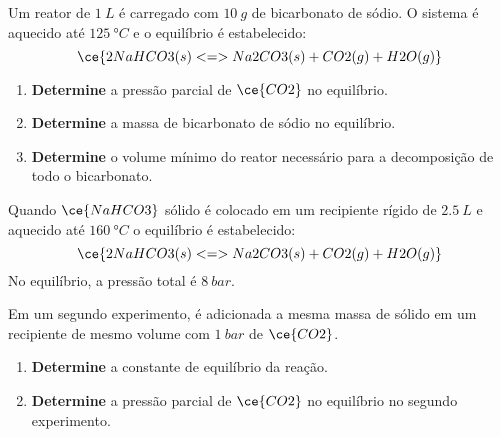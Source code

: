 \begin{problem}[
	id={2F59},
	path={/home/braun/Documents/Developer/braunchem/data/problems/Q2/2F/2F59}
]
Um reator de {\(\qty{1}{\unit{L}}\)} é carregado com {\(\qty{10}{\unit{g}}\)} de bicarbonato de sódio. O sistema é aquecido até
{\(\qty{125}{\unit{\degree C}}\)} e o equilíbrio é estabelecido: {\[
    \ce{ 2 NaHCO3(s) <=> Na2CO3(s) + CO2(g) + H2O(g) }
\]}

\begin{enumerate}
\def\labelenumi{\alph{enumi}.}
\tightlist
\item
  \textbf{Determine} a pressão parcial de {\(\ce{CO2}\)} no equilíbrio.
\item
  \textbf{Determine} a massa de bicarbonato de sódio no equilíbrio.
\item
  \textbf{Determine} o volume mínimo do reator necessário para a decomposição de todo o bicarbonato.
\end{enumerate}

\end{problem}


\begin{problem}[
	id={2F60},
	path={/home/braun/Documents/Developer/braunchem/data/problems/Q2/2F/2F60}
]
Quando {\(\ce{NaHCO3}\)} sólido é colocado em um recipiente rígido de {\(\qty{2,5}{\unit{L}}\)} e aquecido até {\(\qty{160}{\unit{\degree C}}\)} o
equilíbrio é estabelecido: {\[
    \ce{ 2 NaHCO3(s) <=> Na2CO3(s) + CO2(g) + H2O(g) }
\]} No equilíbrio, a pressão total é {\(\qty{8}{\unit{bar}}\)}.

Em um segundo experimento, é adicionada a mesma massa de sólido em um recipiente de mesmo volume com {\(\qty{1}{\unit{bar}}\)} de {\(\ce{CO2}\)}.

\begin{enumerate}
\def\labelenumi{\alph{enumi}.}
\tightlist
\item
  \textbf{Determine} a constante de equilíbrio da reação.
\item
  \textbf{Determine} a pressão parcial de {\(\ce{CO2}\)} no equilíbrio no segundo experimento.
\end{enumerate}

\end{problem}


